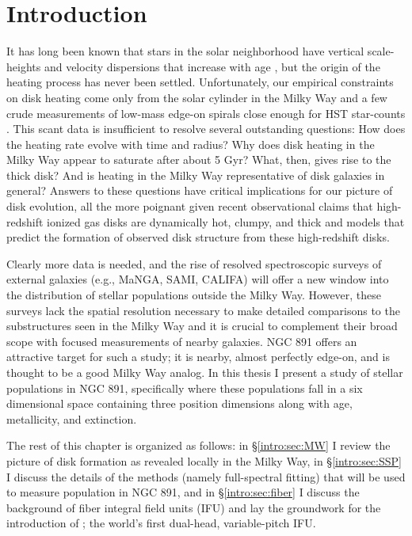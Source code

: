 \chapter[Introduction]{Introduction}
\label{chap:intro}


\clearpage
It has long been known that stars in the solar neighborhood have
vertical scale-heights and velocity dispersions that increase with age
\citep[e.g.,][]{Wielen74}, but the origin of the heating process has
never been settled. Unfortunately, our empirical constraints on disk
heating come only from the solar cylinder in the Milky Way and a few
crude measurements of low-mass edge-on spirals close enough for HST
star-counts \citep{Seth05a}. This scant data is insufficient to resolve
several outstanding questions: How does the heating rate evolve with
time and radius?  Why does disk heating in the Milky Way appear to
saturate after about 5 Gyr?  What, then, gives rise to the thick disk?
And is heating in the Milky Way representative of disk galaxies in
general? Answers to these questions have critical implications for our
picture of disk evolution, all the more poignant given recent
observational claims that high-redshift ionized gas disks are
dynamically hot, clumpy, and thick \citep{Forster-Schreiber09} and
models \citep{Bird13} that predict the formation of observed disk
structure from these high-redshift disks.

Clearly more data is needed, and the rise of resolved spectroscopic
surveys of external galaxies (e.g., MaNGA, SAMI, CALIFA) will offer a
new window into the distribution of stellar populations outside the
Milky Way. However, these surveys lack the spatial resolution
necessary to make detailed comparisons to the substructures seen in
the Milky Way and it is crucial to complement their broad scope with
focused measurements of nearby galaxies. NGC 891 offers an attractive
target for such a study; it is nearby, almost perfectly edge-on, and
is thought to be a good Milky Way analog. In this thesis I present a
study of stellar populations in NGC 891, specifically where these
populations fall in a six dimensional space containing three position
dimensions along with age, metallicity, and extinction.

The rest of this chapter is organized as follows: in
\S\ref{intro:sec:MW} I review the picture of disk formation as
revealed locally in the Milky Way, in \S\ref{intro:sec:SSP} I discuss
the details of the methods (namely full-spectral fitting) that will be
used to measure population in NGC 891, and in \S\ref{intro:sec:fiber}
I discuss the background of fiber integral field units (IFU) and lay
the groundwork for the introduction of \GP; the world's first
dual-head, variable-pitch IFU.


